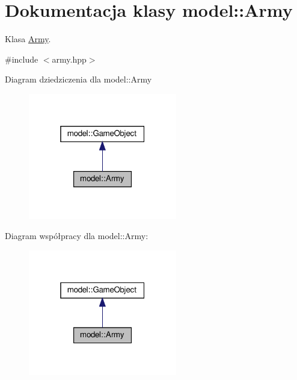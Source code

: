 \hypertarget{classmodel_1_1Army}{}\section{Dokumentacja klasy model\+:\+:Army}
\label{classmodel_1_1Army}


Klasa \hyperlink{classmodel_1_1Army}{Army}.  




{\ttfamily \#include $<$army.\+hpp$>$}



Diagram dziedziczenia dla model\+:\+:Army\nopagebreak
\begin{figure}[H]
\begin{center}
\leavevmode
\includegraphics[width=184pt]{classmodel_1_1Army__inherit__graph}
\end{center}
\end{figure}


Diagram współpracy dla model\+:\+:Army\+:\nopagebreak
\begin{figure}[H]
\begin{center}
\leavevmode
\includegraphics[width=184pt]{classmodel_1_1Army__coll__graph}
\end{center}
\end{figure}
